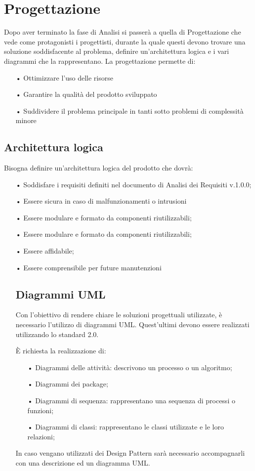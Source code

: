\section{Progettazione}
Dopo aver terminato la fase di Analisi si passerà a quella di Progettazione che vede come protagonisti i progettisti, durante la quale questi devono trovare una soluzione soddisfacente al problema, definire un’architettura logica e i vari diagrammi che la rappresentano.
La progettazione permette di: 
\begin{itemize}
\item[•] Ottimizzare l'uso delle risorse 
\item[•] Garantire la qualità del prodotto sviluppato 
\item[•] Suddividere il problema principale in tanti sotto problemi di complessità minore 
\end{itemize}

\subsection{Architettura logica}
Bisogna definire un'architettura logica del prodotto che dovrà: 
\begin{itemize}
\item[•] Soddisfare i requisiti definiti nel documento di Analisi dei Requisiti v.1.0.0;
\item[•] Essere sicura in caso di malfunzionamenti o intrusioni \item[•] Essere modulare e formato da componenti riutilizzabili;
\item[•] Essere modulare e formato da componenti riutilizzabili;
\item[•] Essere affidabile;
\item[•] Essere comprensibile per future manutenzioni

\subsection{Diagrammi UML}
Con l’obiettivo di rendere chiare le soluzioni progettuali utilizzate, è necessario l’utilizzo di diagrammi UML. Quest’ultimi devono essere realizzati utilizzando lo standard 2.0.

È richiesta la realizzazione di:
\begin{itemize}
\item[•] Diagrammi delle attività: descrivono un processo o un algoritmo;
\item[•] Diagrammi dei package;
\item[•] Diagrammi di sequenza: rappresentano una sequenza di processi o funzioni;
\item[•] Diagrammi di classi: rappresentano le classi utilizzate e le loro relazioni;
\end{itemize}
In caso vengano utilizzati dei Design Pattern sarà necessario accompagnarli con una descrizione ed un diagramma UML.

\end{itemize}

